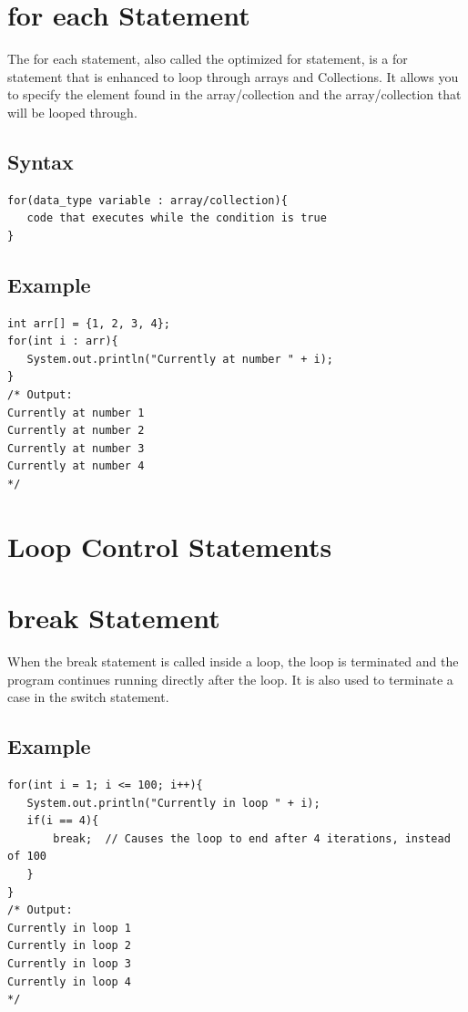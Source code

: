\documentclass[a4paper]{article}
\begin{document}
\section*{for each Statement}
The for each statement, also called the optimized for statement, is a for
statement that is enhanced to loop through arrays and Collections. It allows you
to specify the element found in the array/collection and the array/collection
that will be looped through.

\subsection*{Syntax}
\begin{lstlisting}
for(data_type variable : array/collection){
   code that executes while the condition is true
}
\end{lstlisting}

\subsection*{Example}
\begin{lstlisting}
int arr[] = {1, 2, 3, 4};
for(int i : arr){
   System.out.println("Currently at number " + i);
}
/* Output:
Currently at number 1
Currently at number 2
Currently at number 3
Currently at number 4
*/
\end{lstlisting}

\section*{Loop Control Statements}

\section*{break Statement}

When the break statement is called inside a loop, the loop is terminated and
the program continues running directly after the loop. It is also used to
terminate a case in the switch statement.

\subsection*{Example}
\begin{lstlisting}
for(int i = 1; i <= 100; i++){
   System.out.println("Currently in loop " + i);
   if(i == 4){
       break;  // Causes the loop to end after 4 iterations, instead of 100
   }
}
/* Output:
Currently in loop 1
Currently in loop 2
Currently in loop 3
Currently in loop 4
*/
\end{lstlisting}
\end{document}
